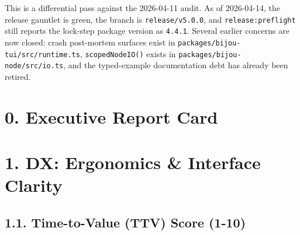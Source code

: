 This is a differential pass against the 2026-04-11 audit. As of 2026-04-14, the release gauntlet is green, the branch is \texttt{r\allowbreak{}e\allowbreak{}l\allowbreak{}e\allowbreak{}a\allowbreak{}s\allowbreak{}e\allowbreak{}/\allowbreak{}v\allowbreak{}5\allowbreak{}.\allowbreak{}0\allowbreak{}.\allowbreak{}0}, and \texttt{r\allowbreak{}e\allowbreak{}l\allowbreak{}e\allowbreak{}a\allowbreak{}s\allowbreak{}e\allowbreak{}:\allowbreak{}p\allowbreak{}r\allowbreak{}e\allowbreak{}f\allowbreak{}l\allowbreak{}i\allowbreak{}g\allowbreak{}h\allowbreak{}t} still reports the lock-step package version as \texttt{4\allowbreak{}.\allowbreak{}4\allowbreak{}.\allowbreak{}1}. Several earlier concerns are now closed: crash post-mortem surfaces exist in \texttt{p\allowbreak{}a\allowbreak{}c\allowbreak{}k\allowbreak{}a\allowbreak{}g\allowbreak{}e\allowbreak{}s\allowbreak{}/\allowbreak{}b\allowbreak{}i\allowbreak{}j\allowbreak{}o\allowbreak{}u\allowbreak{}-\allowbreak{}t\allowbreak{}u\allowbreak{}i\allowbreak{}/\allowbreak{}s\allowbreak{}r\allowbreak{}c\allowbreak{}/\allowbreak{}r\allowbreak{}u\allowbreak{}n\allowbreak{}t\allowbreak{}i\allowbreak{}m\allowbreak{}e\allowbreak{}.\allowbreak{}t\allowbreak{}s}, \texttt{s\allowbreak{}c\allowbreak{}o\allowbreak{}p\allowbreak{}e\allowbreak{}d\allowbreak{}N\allowbreak{}o\allowbreak{}d\allowbreak{}e\allowbreak{}I\allowbreak{}O\allowbreak{}(\allowbreak{})} exists in \texttt{p\allowbreak{}a\allowbreak{}c\allowbreak{}k\allowbreak{}a\allowbreak{}g\allowbreak{}e\allowbreak{}s\allowbreak{}/\allowbreak{}b\allowbreak{}i\allowbreak{}j\allowbreak{}o\allowbreak{}u\allowbreak{}-\allowbreak{}n\allowbreak{}o\allowbreak{}d\allowbreak{}e\allowbreak{}/\allowbreak{}s\allowbreak{}r\allowbreak{}c\allowbreak{}/\allowbreak{}i\allowbreak{}o\allowbreak{}.\allowbreak{}t\allowbreak{}s}, and the typed-example documentation debt has already been retired.

\section{0. Executive Report Card}\label{record-416-executive-report-card}



\section{1. DX: Ergonomics \& Interface Clarity}\label{record-416-dx-ergonomics-interface-clarity}

\subsection{1.1. Time-to-Value (TTV) Score (1-10)}\label{record-416-time-to-value-ttv-score-1-10}

